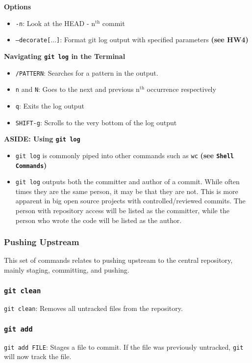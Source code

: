 \documentclass[13pt]{article}
\begin{document}
\textbf{Options}
\begin{itemize}[label=]
\item \texttt{-n}: Look at the HEAD - n$^\text{th}$ commit
\item \texttt{--decorate[$\ldots$]}: Format git log output with specified parameters \textbf{(see HW4)}
\end{itemize}

\textbf{Navigating \texttt{git log} in the Terminal}
\begin{itemize}[label=]
\item \texttt{/PATTERN}: Searches for a pattern in the output.
\item \texttt{n} and \texttt{N}: Goes to the next and previous n$^\text{th}$ occurrence respectively
\item \texttt{q}: Exits the log output
\item \texttt{SHIFT-g}: Scrolls to the very bottom of the log output
\end{itemize}

\textbf{ASIDE: Using \texttt{git log}}
\begin{itemize}[label=]
\item \texttt{git log} is commonly piped into other commands such as \texttt{wc} \textbf{(see \texttt{Shell Commands})}
\item \texttt{git log} outputs both the committer and author of a commit. While often times they are the same person, it may be that they are not. This is more apparent in big open source projects with controlled/reviewed commits. The person with repository access will be listed as the committer, while the person who wrote the code will be listed as the author.
\end{itemize}






\subsubsection{Pushing Upstream}
This set of commands relates to pushing upstream to the central repository, mainly staging, committing, and pushing.

\subsubsection*{\texttt{git clean}}
\texttt{git clean}: Removes all untracked files from the repository.

\subsubsection*{\texttt{git add}}
\texttt{git add FILE}: Stages a file to commit. If the file was previously untracked, \texttt{git} will now track the file.
\end{document}
